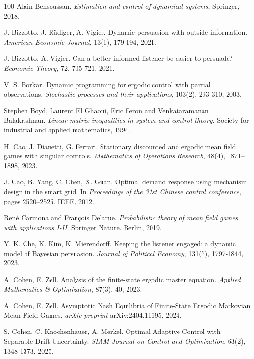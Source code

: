 \documentclass[a4paper,10pt]{article}
\theoremstyle{definition}
\theoremstyle{plain}
\numberwithin{equation}{section}
\begin{document}
\begin{thebibliography}{100}
Alain Bensoussan. {\em Estimation and control of dynamical systems}, Springer, 2018.

J. Bizzotto, J. Rüdiger,  A. Vigier. Dynamic persuasion with outside information. {\em American Economic Journal}, 13(1), 179-194, 2021.

J. Bizzotto, A.  Vigier. Can a better informed listener be easier to persuade? {\em Economic Theory}, 72, 705-721, 2021.

V. S. Borkar. Dynamic programming for ergodic control with partial observations. {\em Stochastic processes and their applications}, 103(2), 293-310, 2003.

Stephen Boyd, Laurent El Ghaoui, Eric Feron and Venkataramanan Balakrishnan. {\em Linear matrix inequalities in system and control theory}. Society for industrial and applied mathematics, 1994.

H. Cao, J. Dianetti, G. Ferrari. Stationary discounted and ergodic mean field games with singular controls. {\em Mathematics of Operations Research}, 48(4), 1871--1898, 2023.

J. Cao, B. Yang, C. Chen,  X. Guan.
\newblock Optimal demand response using mechanism design in the smart grid.
\newblock In {\em Proceedings of the 31st Chinese control conference}, pages
  2520--2525. IEEE, 2012.
  
Ren\'e Carmona and Fran\c{c}ois Delarue. {\em Probabilistic theory of mean field games with applications I-II}. Springer Nature, Berlin, 2019.

Y. K. Che, K. Kim, K. Mierendorff. Keeping the listener engaged: a dynamic model of Bayesian persuasion. {\em Journal of Political Economy}, 131(7), 1797-1844, 2023.

A. Cohen, E. Zell. Analysis of the finite-state ergodic master equation. {\em Applied Mathematics \& Optimization}, 87(3), 40, 2023.

A. Cohen, E. Zell. Asymptotic Nash Equilibria of Finite-State Ergodic Markovian Mean Field Games. {\em arXiv preprint} arXiv:2404.11695, 2024.

S. Cohen, C. Knochenhauer, A. Merkel. Optimal Adaptive Control with Separable Drift Uncertainty. {\em SIAM Journal on Control and Optimization}, 63(2), 1348-1373, 2025.


\end{thebibliography}
\end{document}
